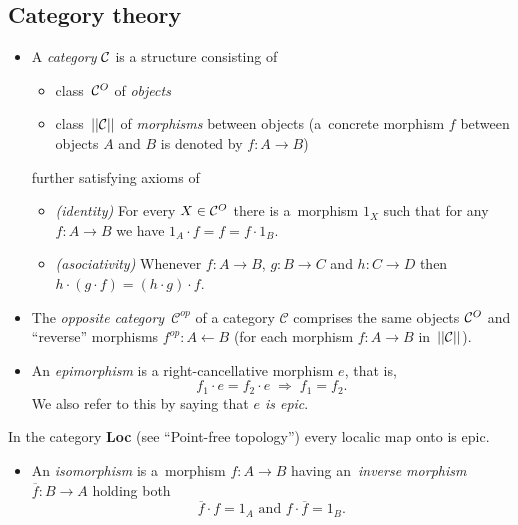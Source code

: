 \subsection*{Category theory}

\begin{itemize}
\item A \emph{category} $\mathcal{C}$ is a structure consisting of
  \begin{itemize}
  \item class~$\mathcal{C}^O$ of \emph{objects\/}
  \item class~$||\mathcal{C}||$ of \emph{morphisms\/} between objects 
  (a~concrete morphism $f$ between objects $A$ and $B$ is denoted by $f\colon A
   \to B$)
  \end{itemize}
further satisfying axioms of
  \begin{itemize}
  \item \emph{(identity)\/}
  For every $X\in \mathcal{C}^O$ there is a~morphism $1_X$ such that for any $f\colon A \to B$
  we have $1_A \cdot f = f = f \cdot 1_B$.
  \item \emph{(asociativity)\/}
  Whenever $f\colon A \to B$, $g\colon B \to C$ and $h\colon C \to D$ then $h
  \cdot (g \cdot f) = (h \cdot g) \cdot f$.
  \end{itemize}

\item The \emph{opposite category}~$\mathcal{C}^{op}$ of a category
$\mathcal{C}$ comprises the same objects $\mathcal{C}^O$ and ``reverse'' morphisms
$f^{op}\colon A \leftarrow B$ (for each morphism $f\colon A \to B$
in~$||\mathcal{C}||$).

\item An \emph{epimorphism} is a right-cancellative morphism $e$, that is,
\[
  f_1 \cdot e = f_2 \cdot e \; \Longrightarrow \; f_1 = f_2.
\]
We also refer to this by saying that \emph{$e$ is epic\/}.
\end{itemize}

\begin{exmpl}
  In the category {\bf Loc} (see ``Point-free topology'') every localic map
  onto is epic.
\end{exmpl}

\begin{itemize}
\item An \emph{isomorphism} is a~morphism $f\colon A \to B$ having an~\emph{inverse
morphism\/} $\overline{f}\colon B \to A$ holding both
\[
  \overline{f} \cdot f = 1_A \text{ and } f \cdot \overline{f} = 1_B.
\]
\end{itemize}

